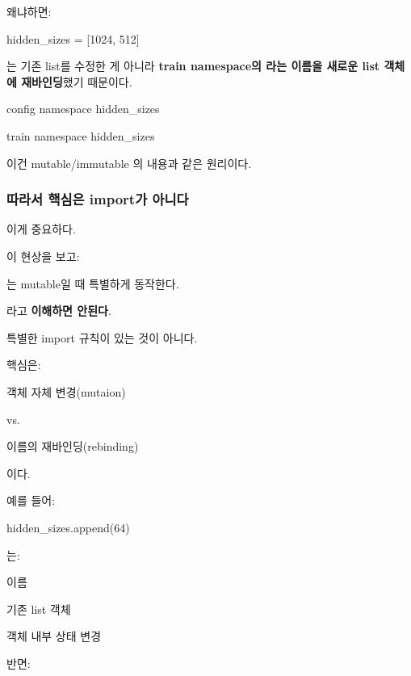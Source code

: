왜냐하면:

\begin{dhkcode}
hidden_sizes = [1024, 512]
\end{dhkcode}

는 기존 list를 수정한 게 아니라 \textbf{train namespace의 라는 이름을 새로운 list 객체에 재바인딩}했기 때문이다.

\begin{dhksmry}
    config namespace
    hidden_sizes \ra [512, 256, 128]


    train namespace
    hidden_sizes \ra [1024, 512]
\end{dhksmry}

이건 mutable/immutable 의 내용과 같은 원리이다.

\subsubsection{따라서 핵심은 import가 아니다}

이게 중요하다.

이 현상을 보고:

\begin{dhksmry}[centered]
는 mutable일 때 특별하게 동작한다.
\end{dhksmry}

라고 \textbf{이해하면 안된다}.

특별한 import 규칙이 있는 것이 아니다.

핵심은:

\begin{dhksmry}[centered]
객체 자체 변경(mutaion)

vs.

이름의 재바인딩(rebinding)
\end{dhksmry}

이다.

예를 들어:

\begin{dhkcode}
hidden_sizes.append(64)
\end{dhkcode}

는:

\begin{dhksmry}[centered]
이름

\da

기존 list 객체

\da

객체 내부 상태 변경
\end{dhksmry}

반면:

